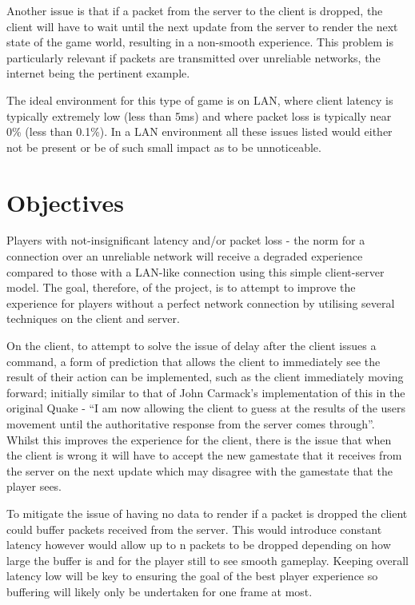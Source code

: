 \documentclass{article}
\begin{document}
	Another issue is that if a packet from the server to the client is dropped, the client will have to wait until the next update from the server to render the next state of the game world, resulting in a non-smooth experience. This problem is particularly relevant if packets are transmitted over unreliable networks, the internet being the pertinent example. 

	The ideal environment for this type of game is on LAN, where client latency is typically extremely low (less than 5ms) and where packet loss is typically near 0\% (less than 0.1\%). In a LAN environment all these issues listed would either not be present or be of such small impact as to be unnoticeable.

\section{Objectives}
	
	Players with not-insignificant latency and/or packet loss - the norm for a connection over an unreliable network will receive a degraded experience compared to those with a LAN-like connection using this simple client-server model. The goal, therefore, of the project, is to attempt to improve the experience for players without a perfect network connection by utilising several techniques on the client and server.

	On the client, to attempt to solve the issue of delay after the client issues a command, a form of prediction that allows the client to immediately see the result of their action can be implemented, such as the client immediately moving forward; initially similar to that of John Carmack's implementation of this in the original Quake \cite{carmack} - ``I am now allowing the client to guess at the results of the users movement until the authoritative response from the server comes through''. Whilst this improves the experience for the client, there is the issue that when the client is wrong it will have to accept the new gamestate that it receives from the server on the next update which may disagree with the gamestate that the player sees.

	To mitigate the issue of having no data to render if a packet is dropped the client could buffer packets received from the server. This would introduce constant latency however would allow up to n packets to be dropped depending on how large the buffer is \cite{volvoSource} and for the player still to see smooth gameplay. Keeping overall latency low will be key to ensuring the goal of the best player experience so buffering will likely only be undertaken for one frame at most.
\end{document}
